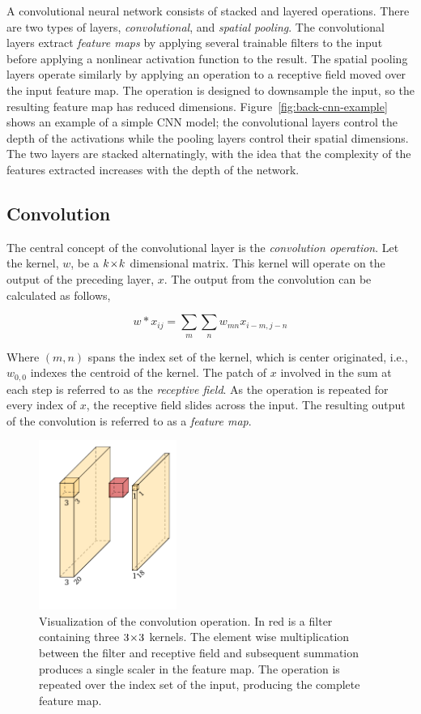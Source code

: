 A convolutional neural network consists of stacked and layered operations.
There are two types of layers, \textit{convolutional}, and \textit{spatial pooling}.
The convolutional layers extract \textit{feature maps} by applying several trainable filters to the input before applying a nonlinear activation function to the result.
The spatial pooling layers operate similarly by applying an operation to a receptive field moved over the input feature map.
The operation is designed to downsample the input, so the resulting feature map has reduced dimensions.
Figure~\ref{fig:back-cnn-example} shows an example of a simple CNN model; the convolutional layers control the depth of the activations while the pooling layers control their spatial dimensions.
The two layers are stacked alternatingly, with the idea that the complexity of the features extracted increases with the depth of the network.%

\subsection{Convolution}
The central concept of the convolutional layer is the \textit{convolution operation}.
Let the kernel, \(w\), be a \(k\!\times \! k\) dimensional matrix.
This kernel will operate on the output of the preceding layer, \(x\).
The output from the convolution can be calculated as follows,

\[w\ast x_{ij}=\sum_{m}\sum_{n}  w_{mn}x_{i-m,j-n}\]

Where \((m,n)\) spans the index set of the kernel, which is center originated, i.e., \(w_{0,0}\) indexes the centroid of the kernel.
The patch of \(x\) involved in the sum at each step is referred to as the \textit{receptive field}.
As the operation is repeated for every index of \(x\), the receptive field slides across the input.
The resulting output of the convolution is referred to as a \textit{feature map}.

\begin{figure}[htb]
  \centering
  \includegraphics[width=0.4\textwidth]{figs/background/conv.pdf}
  \caption[Convolution operation]{Visualization of the convolution operation.
In red is a filter containing three \(3\!\times \! 3\) kernels.
The element wise multiplication between the filter and receptive field and subsequent summation produces a single scaler in the feature map.
The operation is repeated over the index set of the input, producing the complete feature map.}\label{fig:cnn}
\end{figure}

